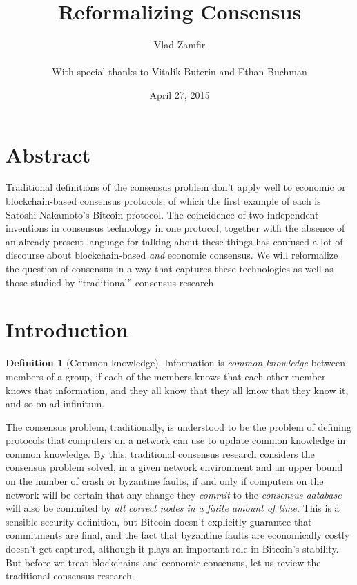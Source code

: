 \documentclass[11pt,a4paper]{article}
\title{Reformalizing Consensus}
\date{April 27, 2015}
\author{Vlad Zamfir\\
 			\\
 			\small With special thanks to Vitalik Buterin and Ethan Buchman}
\theoremstyle{plain}
\theoremstyle{definition}
\newtheorem{defn}{Definition}
\begin{document}
\maketitle
\tableofcontents


\section{Abstract}

Traditional definitions of the consensus problem don't apply well to economic or blockchain-based consensus protocols, of which the first example of each is Satoshi Nakamoto's Bitcoin protocol. The coincidence of two independent inventions in consensus technology in one protocol, together with the absence of an already-present language for talking about these things has confused a lot of discourse about blockchain-based \emph{and} economic consensus. We will reformalize the question of consensus in a way that captures these technologies as well as those studied by ``traditional'' consensus research.

\vspace{0.5cm}


\section{Introduction}

\begin{defn}[Common knowledge]
Information is \emph{common knowledge} between members of a group, if each of the members knows that each other member knows that information, and they all know that they all know that they know it, and so on ad infinitum.
\end{defn}

The consensus problem, traditionally, is understood to be the problem of defining protocols that computers on a network can use to update common knowledge in common knowledge. By this, traditional consensus research considers the consensus problem solved, in a given network environment and an upper bound on the number of crash or byzantine faults, if and only if computers on the network will be certain that any change they \emph{commit} to the \emph{consensus database} will also be commited by \emph{all correct nodes in a finite amount of time}. This is a sensible security definition, but Bitcoin doesn't explicitly guarantee that commitments are final, and the fact that byzantine faults are economically costly doesn't get captured, although it plays an important role in Bitcoin's stability. But before we treat blockchains and economic consensus, let us review the traditional consensus research.
\end{document}
